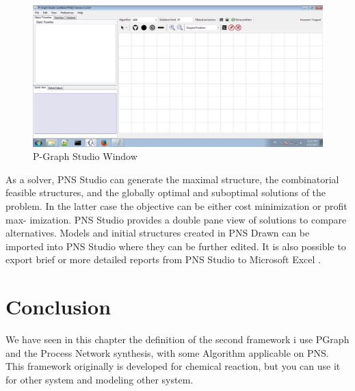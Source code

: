 \begin{figure}[th]
	\centering %
 	\includegraphics[scale=0.44]{ch3/img/pgraph}
	\caption{\label{fig:pgraphstudio)}P-Graph Studio Window}
\end{figure} 

As a solver, PNS Studio can generate the maximal structure, the combinatorial feasible structures, and the globally optimal
and suboptimal solutions of the problem. In the latter case the objective can be either cost minimization or profit max-
imization. PNS Studio provides a double pane view of solutions to compare alternatives.
Models and initial structures created in PNS Drawn can be imported into PNS Studio where they can be further edited. It
is also possible to export brief or more detailed reports from PNS Studio to Microsoft Excel \cite{ch3-pgraph}.
 
 
\section{Conclusion}
We have seen in this chapter the definition of the second framework i use PGraph and the Process Network synthesis, with some Algorithm applicable on PNS. This framework originally is developed for chemical reaction, but you can use it for other system and modeling other system.

